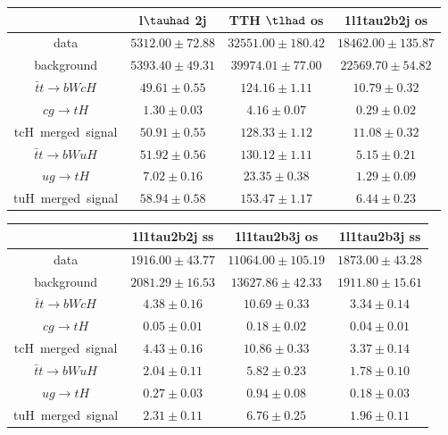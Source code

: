 \begin{tabular}{|c|c|c|c|} \hline
 & l$\tauhad$ 2j   & TTH $\tlhad$ os   & 1l1tau2b2j os  \\\hline
data & $5312.00\pm72.88$ & $32551.00\pm180.42$ & $18462.00\pm135.87$\\\hline
background & $5393.40\pm49.31$ & $39974.01\pm77.00$ & $22569.70\pm54.82$\\\hline
$\bar{t}t\to bWcH$ & $49.61\pm0.55$ & $124.16\pm1.11$ & $10.79\pm0.32$\\\hline
$cg\to tH$ & $1.30\pm0.03$ & $4.16\pm0.07$ & $0.29\pm0.02$\\\hline
tcH~merged~signal & $50.91\pm0.55$ & $128.33\pm1.12$ & $11.08\pm0.32$\\\hline
$\bar{t}t\to bWuH$ & $51.92\pm0.56$ & $130.12\pm1.11$ & $5.15\pm0.21$\\\hline
$ug\to tH$ & $7.02\pm0.16$ & $23.35\pm0.38$ & $1.29\pm0.09$\\\hline
tuH~merged~signal & $58.94\pm0.58$ & $153.47\pm1.17$ & $6.44\pm0.23$\\\hline
\end{tabular}
\begin{tabular}{|c|c|c|c|} \hline
 & 1l1tau2b2j ss   & 1l1tau2b3j os   & 1l1tau2b3j ss  \\\hline
data & $1916.00\pm43.77$ & $11064.00\pm105.19$ & $1873.00\pm43.28$\\\hline
background & $2081.29\pm16.53$ & $13627.86\pm42.33$ & $1911.80\pm15.61$\\\hline
$\bar{t}t\to bWcH$ & $4.38\pm0.16$ & $10.69\pm0.33$ & $3.34\pm0.14$\\\hline
$cg\to tH$ & $0.05\pm0.01$ & $0.18\pm0.02$ & $0.04\pm0.01$\\\hline
tcH~merged~signal & $4.43\pm0.16$ & $10.86\pm0.33$ & $3.37\pm0.14$\\\hline
$\bar{t}t\to bWuH$ & $2.04\pm0.11$ & $5.82\pm0.23$ & $1.78\pm0.10$\\\hline
$ug\to tH$ & $0.27\pm0.03$ & $0.94\pm0.08$ & $0.18\pm0.03$\\\hline
tuH~merged~signal & $2.31\pm0.11$ & $6.76\pm0.25$ & $1.96\pm0.11$\\\hline
\end{tabular}
